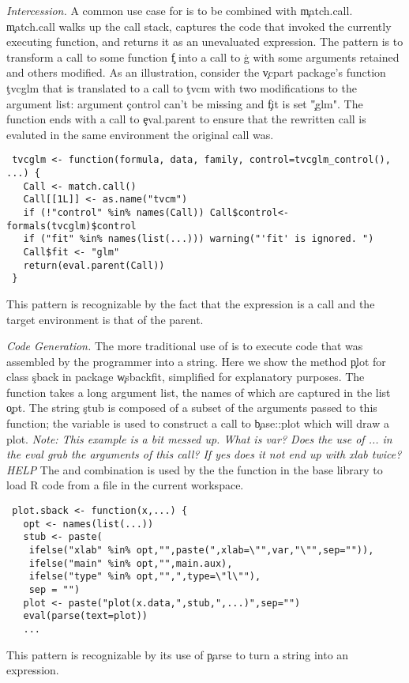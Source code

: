 \documentclass[USenglish,cleveref, autoref, thm-restate]{lipics-v2019}
\newcommand{\mypara}[1]{\medskip\noindent\emph{#1}\xspace}
\newcommand{\NOTE}[1]{{\it Note: #1}\xspace}
\begin{document}
\mypara{Intercession.} A common use case for \eval is to be combined
with \c{match.call}. \c{match.call} walks up the call stack, captures
the code that invoked the currently executing function, and returns it
as an unevaluated expression. The pattern is to transform a call to
some function \c{f} into a call to \c{g} with some arguments retained
and others modified. As an illustration, consider the \c{vcpart}
package's function \c{tvcglm} that is translated to a call to \c{tvcm}
with two modifications to the argument list: argument \c{control}
can't be missing and \c{fit} is set  \c{"glm"}. The
function ends with a call to \c{eval.parent} to ensure that the
rewritten call is evaluted in the same environment the original call
was.
\begin{lstlisting}
 tvcglm <- function(formula, data, family, control=tvcglm_control(), ...) {
   Call <- match.call()
   Call[[1L]] <- as.name("tvcm")
   if (!"control" %in% names(Call)) Call$control<-formals(tvcglm)$control
   if ("fit" %in% names(list(...))) warning("'fit' is ignored. ")
   Call$fit <- "glm"
   return(eval.parent(Call))
 }
\end{lstlisting}
This pattern is recognizable by the fact that the expression is a call
and the target environment is that of the parent.

\mypara{Code Generation.} The more traditional use of \eval is to
execute code that was assembled by the programmer into a string. Here
we show the method \c{plot} for class \c{sback} in package
\c{wsbackfit}, simplified for explanatory purposes. The function takes
a long argument list, the names of which are captured in the list
\c{opt}. The string \c{stub} is composed of a subset of the arguments
passed to this function; the variable is used to construct a call to
\c{base::plot} which will draw a plot. \NOTE{This example is a bit
  messed up. What is var? Does the use of ... in the eval grab the
  arguments of this call? If yes does it not end up with xlab twice?
  HELP} The \parse and \eval combination is used by the the \source
function in the base library to load R code from a file in the current
workspace.
\begin{lstlisting}
 plot.sback <- function(x,...) {
   opt <- names(list(...))
   stub <- paste(
    ifelse("xlab" %in% opt,"",paste(",xlab=\"",var,"\"",sep="")),
    ifelse("main" %in% opt,"",main.aux),
    ifelse("type" %in% opt,"",",type=\"l\""),
    sep = "")
   plot <- paste("plot(x.data,",stub,",...)",sep="")
   eval(parse(text=plot))
   ...
\end{lstlisting}
This pattern is recognizable by its use of \c{parse} to turn a string
into an expression.
\end{document}
